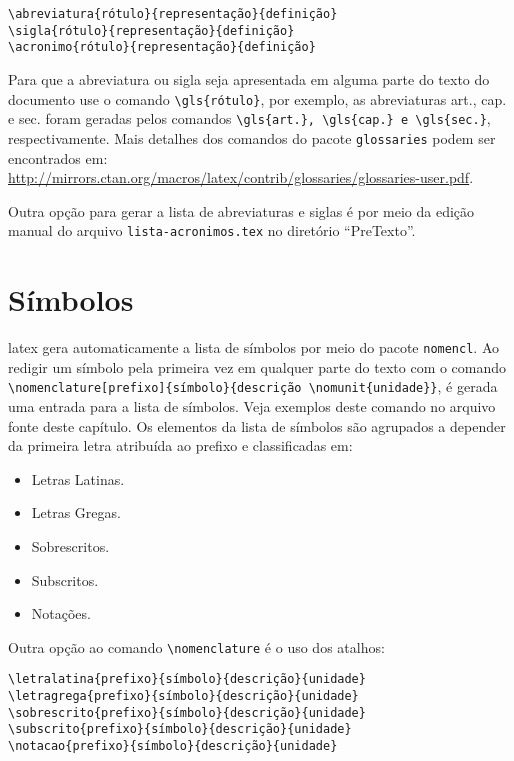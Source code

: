 \begin{SingleSpacing}%
\begin{verbatim}
\abreviatura{rótulo}{representação}{definição}
\sigla{rótulo}{representação}{definição}
\acronimo{rótulo}{representação}{definição}
\end{verbatim}
\end{SingleSpacing}

Para que a abreviatura ou sigla seja apresentada em alguma parte do texto do documento use o comando \verb|\gls{rótulo}|, por exemplo, as abreviaturas \gls{art.}, \gls{cap.} e \gls{sec.} foram geradas pelos comandos \verb|\gls{art.}, \gls{cap.} e \gls{sec.}|, respectivamente. Mais detalhes dos comandos do pacote \texttt{glossaries} podem ser encontrados em: \url{http://mirrors.ctan.org/macros/latex/contrib/glossaries/glossaries-user.pdf}.

Outra opção para gerar a lista de abreviaturas e siglas é por meio da edição manual do arquivo \texttt{lista-acronimos.tex} no diretório ``PreTexto''.

\section{Símbolos}\label{sec:simbolos}

\gls{latex} gera automaticamente a lista de símbolos por meio do pacote \texttt{nomencl}. Ao redigir um símbolo pela primeira vez em qualquer parte do texto com o comando \verb|\nomenclature[prefixo]{símbolo}{descrição \nomunit{unidade}}|, é gerada uma entrada para a lista de símbolos. Veja exemplos deste comando no arquivo fonte deste capítulo. Os elementos da lista de símbolos são agrupados a depender da primeira letra atribuída ao prefixo e classificadas em:

\begin{itemize}%
\item Letras Latinas.
\item Letras Gregas.
\item Sobrescritos.
\item Subscritos.
\item Notações.
\end{itemize}

Outra opção ao comando \verb|\nomenclature| é o uso dos atalhos:

\begin{SingleSpacing}%
\begin{verbatim}
\letralatina{prefixo}{símbolo}{descrição}{unidade}
\letragrega{prefixo}{símbolo}{descrição}{unidade}
\sobrescrito{prefixo}{símbolo}{descrição}{unidade}
\subscrito{prefixo}{símbolo}{descrição}{unidade}
\notacao{prefixo}{símbolo}{descrição}{unidade}
\end{verbatim}
\end{SingleSpacing}

